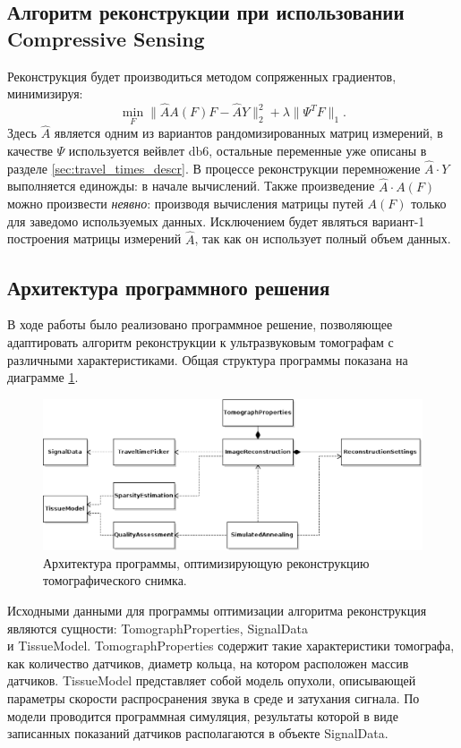 \documentclass[14pt]{matmex-diploma-custom}
\begin{document}
\subsection{Алгоритм реконструкции при использовании \\Compressive Sensing} \label{sec:recon_algo}
Реконструкция будет производиться методом сопряженных градиентов, минимизируя:
\begin{equation}
\label{eq:conj_cs}
\min_F \| \hat{A} A(F) F - \hat{A}Y \|_2^2 + \lambda \| \Psi^T F \|_1.
\end{equation}
Здесь $\hat{A}$ является одним из вариантов рандомизированных матриц измерений, в качестве $\Psi$ используется вейвлет db6, остальные переменные уже описаны в разделе \ref{sec:travel_times_descr}. 
В процессе реконструкции перемножение $\hat{A}\cdot Y$ выполняется единожды: в начале вычислений. Также произведение $\hat{A} \cdot A(F)$ можно произвести \textit{неявно}: производя вычисления матрицы путей $A(F)$ только для заведомо используемых данных. Исключением будет являться вариант-1 построения матрицы измерений $\hat{A}$, так как он использует полный объем данных.


\subsection{Архитектура программного решения}

В ходе работы было реализовано программное решение, позволяющее адаптировать алгоритм реконструкции к ультразвуковым томографам с различными характеристиками. Общая структура программы показана на диаграмме \ref{fig:software}. 

\begin{figure}[h]
    \centering
    \includegraphics[width=0.95\linewidth]{pics_eps/uml_classes.eps}
    \caption{\small Архитектура программы, оптимизирующую реконструкцию томографического снимка.}
    \label{fig:software}
\end{figure}

Исходными данными для программы оптимизации алгоритма реконструкция являются сущности: TomographProperties, SignalData\\ и TissueModel. TomographProperties содержит такие характеристики томографа, как количество датчиков, диаметр кольца, на котором расположен массив датчиков. TissueModel представляет собой модель опухоли, описывающей параметры скорости распросранения звука в среде и затухания сигнала.  По модели проводится программная симуляция, результаты которой в виде записанных показаний датчиков располагаются в объекте SignalData.
\end{document}
